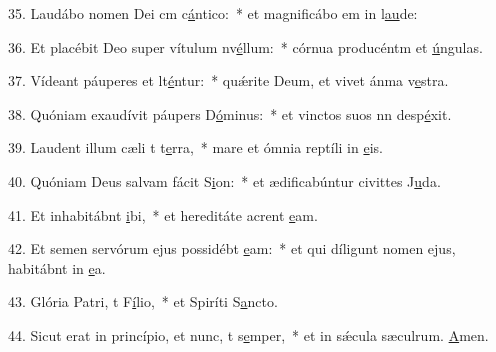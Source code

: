 35. Laudábo nomen Dei cm c\uline{á}ntico:~* et magnificábo em in l\uline{au}de:\par 
36. Et placébit Deo super vítulum nv\uline{é}llum:~* córnua producéntm et \uline{ú}ngulas.\par 
37. Vídeant páuperes et lt\uline{é}ntur:~* quǽrite Deum, et vivet ánma v\uline{e}stra.\par 
38. Quóniam exaudívit páupers D\uline{ó}minus:~* et vinctos suos nn desp\uline{é}xit.\par 
39. Laudent illum cæli t t\uline{e}rra,~* mare et ómnia reptíli in \uline{e}is.\par 
40. Quóniam Deus salvam fácit S\uline{i}on:~* et ædificabúntur civittes J\uline{u}da.\par 
41. Et inhabitábnt \uline{i}bi,~* et hereditáte acrent \uline{e}am.\par 
42. Et semen servórum ejus possidébt \uline{e}am:~* et qui díligunt nomen ejus, habitábnt in \uline{e}a.\par 
43. Glória Patri, t F\uline{í}lio,~* et Spiríti S\uline{a}ncto.\par 
44. Sicut erat in princípio, et nunc, t s\uline{e}mper,~* et in sǽcula sæculrum. \uline{A}men.\par 
